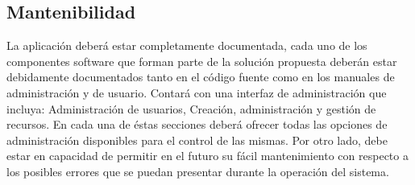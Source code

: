 \subsection{Mantenibilidad}
La aplicación deber\'a estar completamente documentada, cada uno de los componentes software que forman parte de la solución propuesta deber\'an estar debidamente documentados tanto en el c\'odigo fuente como en los manuales de administraci\'on y de usuario.
Contar\'a con una interfaz de administraci\'on que incluya: Administraci\'on de usuarios, Creaci\'on, administraci\'on y gesti\'on de recursos. En cada una de \'estas secciones deber\'a ofrecer todas las opciones de administraci\'on disponibles para el control de las mismas.
Por otro lado, debe estar en capacidad de permitir en el futuro su f\'acil mantenimiento con respecto a los posibles errores que se puedan presentar durante la operación del sistema.
